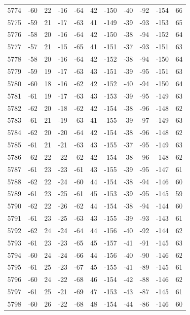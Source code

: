 \begin{table}[H]
\begin{tabular}{lllllllllll}
5774 & -60 & 22 & -16 & -64 & 42 & -150 & -40 & -92 & -154 & 66 \\
5775 & -59 & 21 & -17 & -63 & 41 & -149 & -39 & -93 & -153 & 65 \\
5776 & -58 & 20 & -16 & -64 & 42 & -150 & -38 & -94 & -152 & 64 \\
5777 & -57 & 21 & -15 & -65 & 41 & -151 & -37 & -93 & -151 & 63 \\
5778 & -58 & 20 & -16 & -64 & 42 & -152 & -38 & -94 & -150 & 64 \\
5779 & -59 & 19 & -17 & -63 & 43 & -151 & -39 & -95 & -151 & 63 \\
5780 & -60 & 18 & -16 & -62 & 42 & -152 & -40 & -94 & -150 & 64 \\
5781 & -61 & 19 & -17 & -63 & 43 & -153 & -39 & -95 & -149 & 63 \\
5782 & -62 & 20 & -18 & -62 & 42 & -154 & -38 & -96 & -148 & 62 \\
5783 & -61 & 21 & -19 & -63 & 41 & -155 & -39 & -97 & -149 & 63 \\
5784 & -62 & 20 & -20 & -64 & 42 & -154 & -38 & -96 & -148 & 62 \\
5785 & -61 & 21 & -21 & -63 & 43 & -155 & -37 & -95 & -149 & 63 \\
5786 & -62 & 22 & -22 & -62 & 42 & -154 & -38 & -96 & -148 & 62 \\
5787 & -61 & 23 & -23 & -61 & 43 & -155 & -39 & -95 & -147 & 61 \\
5788 & -62 & 22 & -24 & -60 & 44 & -154 & -38 & -94 & -146 & 60 \\
5789 & -61 & 23 & -25 & -61 & 45 & -153 & -39 & -95 & -145 & 59 \\
5790 & -62 & 22 & -26 & -62 & 44 & -154 & -38 & -94 & -144 & 60 \\
5791 & -61 & 23 & -25 & -63 & 43 & -155 & -39 & -93 & -143 & 61 \\
5792 & -62 & 24 & -24 & -64 & 44 & -156 & -40 & -92 & -144 & 62 \\
5793 & -61 & 23 & -23 & -65 & 45 & -157 & -41 & -91 & -145 & 63 \\
5794 & -60 & 24 & -24 & -66 & 44 & -156 & -40 & -90 & -146 & 62 \\
5795 & -61 & 25 & -23 & -67 & 45 & -155 & -41 & -89 & -145 & 61 \\
5796 & -60 & 24 & -22 & -68 & 46 & -154 & -42 & -88 & -146 & 62 \\
5797 & -61 & 25 & -21 & -69 & 47 & -153 & -43 & -87 & -145 & 61 \\
5798 & -60 & 26 & -22 & -68 & 48 & -154 & -44 & -86 & -146 & 60 \\

\end{tabular}
\end{table}
